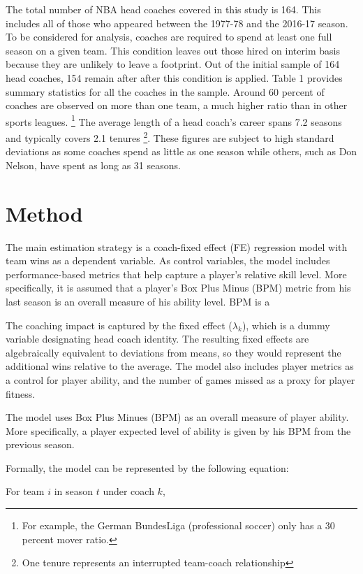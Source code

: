 \documentclass[main.tex]{subfiles}
\begin{document}
The total number of NBA head coaches covered in this study is 164. This includes all of those who appeared between the 1977-78 and the 2016-17 season. To be considered for analysis, coaches are required to spend at least one full season on a given team. This condition leaves out those hired on interim basis because they are unlikely to leave a footprint. Out of the initial sample of 164 head coaches, 154 remain after after this condition is applied. Table 1 provides summary statistics for all the coaches in the sample. Around 60 percent of coaches are observed on more than one team, a much higher ratio than in other sports leagues. \footnote{For example, the German BundesLiga (professional soccer) only has a 30 percent mover ratio.} The average length of a head coach's career spans 7.2 seasons and typically covers 2.1 tenures \footnote{One tenure represents an interrupted team-coach relationship}. These figures are subject to high standard deviations as some coaches spend as little as one season while others, such as Don Nelson, have spent as long as 31 seasons.

\section{Method}

The main estimation strategy is a coach-fixed effect (FE) regression model with team wins as a dependent variable. As control variables, the model includes performance-based metrics that help capture a player's relative skill level. More specifically, it is assumed that a player's Box Plus Minus (BPM) metric from his last season is an overall measure of his ability level. BPM is a 

The coaching impact is captured by the fixed effect ($\lambda_{k}$), which is a dummy variable designating head coach identity. The resulting fixed effects are algebraically equivalent to deviations from means, so they would represent the additional wins relative to the average. The model also includes player metrics as a control for player ability, and the number of games missed as a proxy for player fitness. 

The model uses Box Plus Minues (BPM) as an overall measure of player ability. More specifically, a player expected level of ability is given by his BPM from the previous season. 

Formally, the model can be represented by the following equation: 

For team $i$ in season $t$ under coach $k$,
\end{document}
